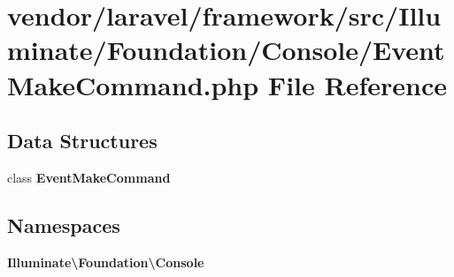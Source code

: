 \section{vendor/laravel/framework/src/\+Illuminate/\+Foundation/\+Console/\+Event\+Make\+Command.php File Reference}
\label{_event_make_command_8php}
\subsection*{Data Structures}
\begin{DoxyCompactItemize}
\item 
class {\bf Event\+Make\+Command}
\end{DoxyCompactItemize}
\subsection*{Namespaces}
\begin{DoxyCompactItemize}
\item 
 {\bf Illuminate\textbackslash{}\+Foundation\textbackslash{}\+Console}
\end{DoxyCompactItemize}
